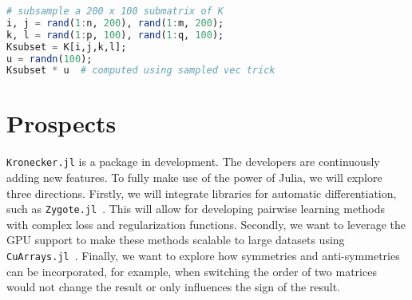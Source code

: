 \documentclass{juliacon}
\begin{document}
\begin{lstlisting}[language = Julia]
# subsample a 200 x 100 submatrix of K
i, j = rand(1:n, 200), rand(1:m, 200);
k, l = rand(1:p, 100), rand(1:q, 100);
Ksubset = K[i,j,k,l];
u = randn(100);
Ksubset * u  # computed using sampled vec trick
\end{lstlisting}

\section{Prospects}

\texttt{Kronecker.jl} is a package in development. The developers are continuously adding new features.
To fully make use of the power of Julia, we will explore three directions.
Firstly, we will integrate libraries for automatic differentiation, such as \texttt{Zygote.jl}~\cite{Innes2019}.
This will allow for developing pairwise learning methods with complex loss and regularization functions. Secondly, we want to leverage the GPU support to make these methods scalable to large datasets using \texttt{CuArrays.jl}~\cite{Besard2019}.
Finally, we want to explore how symmetries and anti-symmetries can be incorporated, for example, when switching the order of two matrices would not change the result or only influences the sign of the result.

\end{document}
